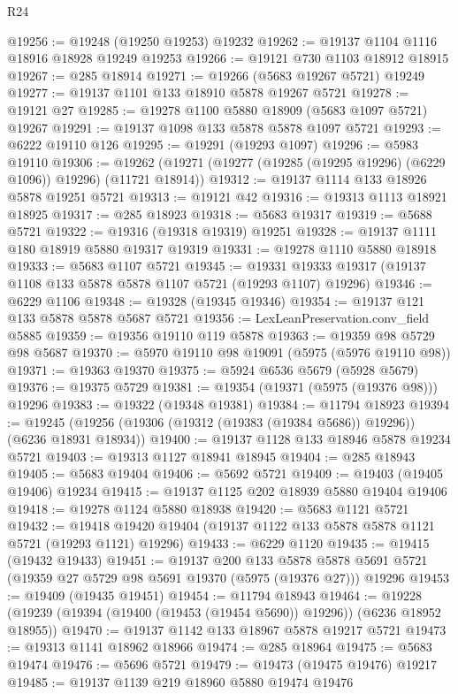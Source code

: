 \begin{lexlean}{R24}
\begin{coremodule}
@19256 := @19248 (@19250 @19253) @19232
@19262 := @19137 @1104 @1116 @18916 @18928 @19249 @19253
@19266 := @19121 @730 @1103 @18912 @18915
@19267 := @285 @18914
@19271 := @19266 (@5683 @19267 @5721) @19249
@19277 := @19137 @1101 @133 @18910 @5878 @19267 @5721
@19278 := @19121 @27
@19285 := @19278 @1100 @5880 @18909 (@5683 @1097 @5721) @19267
@19291 := @19137 @1098 @133 @5878 @5878 @1097 @5721
@19293 := @6222 @19110 @126
@19295 := @19291 (@19293 @1097)
@19296 := @5983 @19110
@19306 := @19262 (@19271 (@19277 (@19285 (@19295 @19296) (@6229 @1096)) @19296) (@11721 @18914))
@19312 := @19137 @1114 @133 @18926 @5878 @19251 @5721
@19313 := @19121 @42
@19316 := @19313 @1113 @18921 @18925
@19317 := @285 @18923
@19318 := @5683 @19317
@19319 := @5688 @5721
@19322 := @19316 (@19318 @19319) @19251
@19328 := @19137 @1111 @180 @18919 @5880 @19317 @19319
@19331 := @19278 @1110 @5880 @18918
@19333 := @5683 @1107 @5721
@19345 := @19331 @19333 @19317 (@19137 @1108 @133 @5878 @5878 @1107 @5721 (@19293 @1107) @19296)
@19346 := @6229 @1106
@19348 := @19328 (@19345 @19346)
@19354 := @19137 @121 @133 @5878 @5878 @5687 @5721
@19356 := LexLeanPreservation.conv_field @5885
@19359 := @19356 @19110 @119 @5878
@19363 := @19359 @98 @5729 @98 @5687
@19370 := @5970 @19110 @98 @19091 (@5975 (@5976 @19110 @98))
@19371 := @19363 @19370
@19375 := @5924 @6536 @5679 (@5928 @5679)
@19376 := @19375 @5729
@19381 := @19354 (@19371 (@5975 (@19376 @98))) @19296
@19383 := @19322 (@19348 @19381)
@19384 := @11794 @18923
@19394 := @19245 (@19256 (@19306 (@19312 (@19383 (@19384 @5686)) @19296)) (@6236 @18931 @18934))
@19400 := @19137 @1128 @133 @18946 @5878 @19234 @5721
@19403 := @19313 @1127 @18941 @18945
@19404 := @285 @18943
@19405 := @5683 @19404
@19406 := @5692 @5721
@19409 := @19403 (@19405 @19406) @19234
@19415 := @19137 @1125 @202 @18939 @5880 @19404 @19406
@19418 := @19278 @1124 @5880 @18938
@19420 := @5683 @1121 @5721
@19432 := @19418 @19420 @19404 (@19137 @1122 @133 @5878 @5878 @1121 @5721 (@19293 @1121) @19296)
@19433 := @6229 @1120
@19435 := @19415 (@19432 @19433)
@19451 := @19137
    @200
    @133
    @5878
    @5878
    @5691
    @5721
    (@19359 @27 @5729 @98 @5691 @19370 (@5975 (@19376 @27)))
    @19296
@19453 := @19409 (@19435 @19451)
@19454 := @11794 @18943
@19464 := @19228 (@19239 (@19394 (@19400 (@19453 (@19454 @5690)) @19296)) (@6236 @18952 @18955))
@19470 := @19137 @1142 @133 @18967 @5878 @19217 @5721
@19473 := @19313 @1141 @18962 @18966
@19474 := @285 @18964
@19475 := @5683 @19474
@19476 := @5696 @5721
@19479 := @19473 (@19475 @19476) @19217
@19485 := @19137 @1139 @219 @18960 @5880 @19474 @19476

\end{coremodule}
\end{lexlean}
